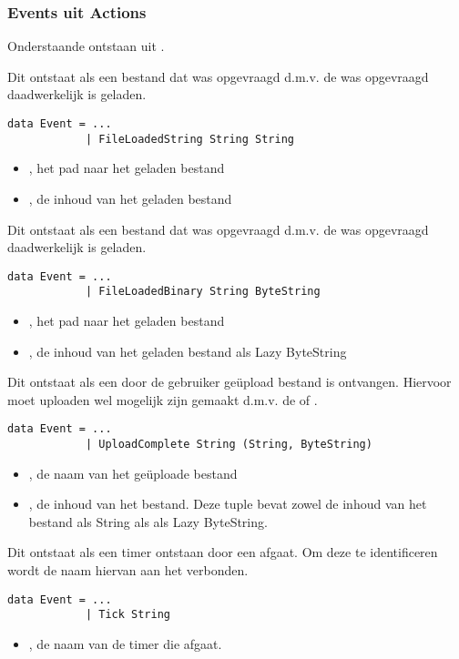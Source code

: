 \subsubsection{Events uit Actions}
Onderstaande \events ontstaan uit \actions.

Dit  ontstaat als een bestand dat was opgevraagd d.m.v. de  was opgevraagd daadwerkelijk is geladen.
\begin{lstlisting}
data Event = ...
			| FileLoadedString String String
\end{lstlisting}
\begin{itemize}
	\item {}, het pad naar het geladen bestand
	\item {}, de inhoud van het geladen bestand
\end{itemize}

Dit  ontstaat als een bestand dat was opgevraagd d.m.v. de  was opgevraagd daadwerkelijk is geladen.
\begin{lstlisting}
data Event = ...
			| FileLoadedBinary String ByteString
\end{lstlisting}
\begin{itemize}
	\item {}, het pad naar het geladen bestand
	\item {}, de inhoud van het geladen bestand als Lazy ByteString
\end{itemize}

Dit  ontstaat als een door de gebruiker geüpload bestand is ontvangen. Hiervoor moet uploaden wel mogelijk zijn gemaakt d.m.v. de  of .
\begin{lstlisting}
data Event = ...
			| UploadComplete String (String, ByteString)
\end{lstlisting}
\begin{itemize}
	\item {}, de naam van het ge\"uploade bestand
	\item {}, de inhoud van het bestand. Deze tuple bevat zowel de inhoud van het bestand als String als als Lazy ByteString.
\end{itemize}

Dit  ontstaat als een timer ontstaan door een  afgaat. Om deze te identificeren wordt de naam hiervan aan het  verbonden.
\begin{lstlisting}
data Event = ...
			| Tick String
\end{lstlisting}
\begin{itemize}
	\item {}, de naam van de timer die afgaat.
\end{itemize}

